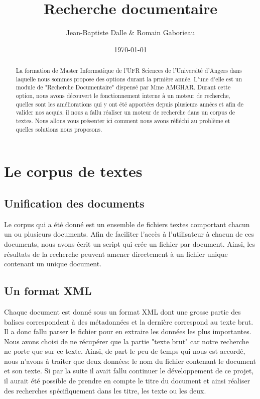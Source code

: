 \documentclass[a4paper,10pt]{article}
\title{Recherche documentaire}
\author{Jean-Baptiste Dalle \& Romain Gaborieau}
\date{\today}
\begin{document}
\maketitle

\newpage

\begin{abstract}

La formation de Master Informatique de l'UFR Sciences de l'Universit\'e d'Angers dans laquelle nous sommes propose des options durant la prmi\`ere ann\'ee. L'une d'elle est un module de "Recherche Documentaire" dispens\'e par Mme AMGHAR. Durant cette option, nous avons d\'ecouvert le fonctionnement interne \`a un moteur de recherche, quelles sont les am\'eliorations qui y ont \'et\'e apport\'ees depuis plusieurs ann\'ees et afin de valider nos acquis, il nous a fallu r\'ealiser un moteur de recherche dans un corpus de textes. Nous allons vous pr\'esenter ici comment nous avons r\'efl\'echi au probl\`eme et quelles solutions nous proposons.

\end{abstract}

\section{Le corpus de textes}

\subsection{Unification des documents}

Le corpus qui a \'et\'e donn\'e est un ensemble de fichiers textes comportant chacun un ou plusieurs documents. Afin de faciliter l'acc\`es \`a l'utilisateur \`a chacun de ces documents, nous avons \'ecrit un script qui cr\'ee un fichier par document. Ainsi, les r\'esultats de la recherche peuvent amener directement \`a un fichier unique contenant un unique document.

\subsection{Un format XML}

Chaque document est donn\'e sous un format XML dont une grosse partie des balises correspondent \`a des m\'etadonn\'ees et la derni\`ere correspond au texte brut. Il a donc fallu parser le fichier pour en extraire les donn\'ees les plus importantes. Nous avons choisi de ne r\'ecup\'erer que la partie "texte brut" car notre recherche ne porte que sur ce texte. Ainsi, de part le peu de temps qui nous est accord\'e, nous n'avons \`a traiter que deux donn\'ees: le nom du fichier contenant le document et son texte. Si par la suite il avait fallu continuer le d\'eveloppement de ce projet, il aurait \'et\'e possible de prendre en compte le titre du document et ainsi r\'ealiser des recherches sp\'ecifiquement dans les titre, les texte ou les deux. 
\end{document}
